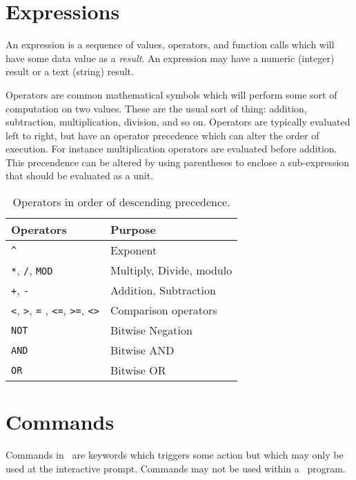 \documentclass{article}
\begin{document}
    \section{Expressions}

    An expression is a sequence of values, operators, and function calls which will have some data value as a {\em result}.
    An expression may have a numeric (integer) result or a text (string) result.

    Operators are common mathematical symbols which will perform some sort of computation on two values. These are the usual
    sort of thing: addition, subtraction, multiplication, division, and so on. Operators are typically evaluated left to right,
    but have an operator precedence which can alter the order of execution. For instance multiplication operators are evaluated
    before addition. This precendence can be altered by using parentheses to enclose a sub-expression that should be evaluated
    as a unit.

    \begin{table}
        \begin{tabular}{|l|l|} \hline
            Operators & Purpose \\ \hline\hline
            \verb+^+ & Exponent \\ \hline
            \verb+*+, \verb+/+, \verb+MOD+ & Multiply, Divide, modulo \\ \hline
            \verb-+-, \verb+-+ & Addition, Subtraction \\ \hline
            \verb+<+, \verb+>+, \verb+=+ , \verb+<=+, \verb+>=+, \verb+<>+ & Comparison operators \\ \hline
            \verb+NOT+ & Bitwise Negation \\ \hline
            \verb+AND+ & Bitwise AND \\ \hline
            \verb+OR+ & Bitwise OR \\ \hline
        \end{tabular}
        \caption{Operators in order of descending precedence.}
    \end{table}
    \section{Commands}

    Commands in \BASIC\ are keywords which triggers some action but which may only be used at the interactive prompt.
    Commands may not be used within a \BASIC\ program.

    \subsection{}
\end{document}
